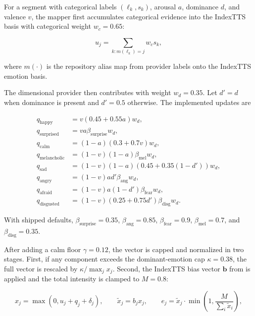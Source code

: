 For a segment with categorical labels \((\ell_k, s_k)\), arousal \(a\), dominance \(d\), and valence \(v\), the mapper first accumulates categorical evidence into the IndexTTS basis with categorical weight \(w_c = 0.65\):

\begin{equation}
u_j = \sum_{k : m(\ell_k)=j} w_c s_k,
\end{equation}

where \(m(\cdot)\) is the repository alias map from provider labels onto the IndexTTS emotion basis.

The dimensional provider then contributes with weight \(w_d = 0.35\). Let \(d' = d\) when dominance is present and \(d'=0.5\) otherwise. The implemented updates are

\begin{align}
q_{\text{happy}} &= v (0.45 + 0.55 a) w_d, \\
q_{\text{surprised}} &= v a \beta_{\text{surprise}} w_d, \\
q_{\text{calm}} &= (1-a)(0.3 + 0.7 v) w_d, \\
q_{\text{melancholic}} &= (1-v)(1-a) \beta_{\text{mel}} w_d, \\
q_{\text{sad}} &= (1-v)(1-a)(0.45 + 0.35(1-d')) w_d, \\
q_{\text{angry}} &= (1-v) a d' \beta_{\text{ang}} w_d, \\
q_{\text{afraid}} &= (1-v) a (1-d') \beta_{\text{fear}} w_d, \\
q_{\text{disgusted}} &= (1-v)(0.25 + 0.75 d') \beta_{\text{disg}} w_d.
\end{align}

With shipped defaults,
\(\beta_{\text{surprise}}=0.35\),
\(\beta_{\text{ang}}=0.85\),
\(\beta_{\text{fear}}=0.9\),
\(\beta_{\text{mel}}=0.7\), and
\(\beta_{\text{disg}}=0.35\).

After adding a calm floor \(\gamma = 0.12\), the vector is capped and normalized in two stages. First, if any component exceeds the dominant-emotion cap \(\kappa = 0.38\), the full vector is rescaled by \(\kappa / \max_j x_j\). Second, the IndexTTS bias vector \(\mathbf{b}\) from  is applied and the total intensity is clamped to \(M = 0.8\):

\begin{equation}
x_j = \max(0, u_j + q_j + \delta_j), \qquad
\tilde{x}_j = b_j x_j, \qquad
e_j = \tilde{x}_j \cdot \min\left(1, \frac{M}{\sum_i \tilde{x}_i}\right),
\end{equation}

